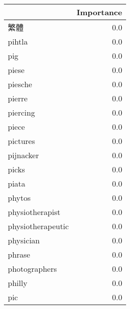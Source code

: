 \begin{tabular}{lr}
\toprule
{} &  Importance \\
\midrule
繁體                &         0.0 \\
pihtla            &         0.0 \\
pig               &         0.0 \\
piese             &         0.0 \\
piesche           &         0.0 \\
pierre            &         0.0 \\
piercing          &         0.0 \\
piece             &         0.0 \\
pictures          &         0.0 \\
pijnacker         &         0.0 \\
picks             &         0.0 \\
piata             &         0.0 \\
phytos            &         0.0 \\
physiotherapist   &         0.0 \\
physiotherapeutic &         0.0 \\
physician         &         0.0 \\
phrase            &         0.0 \\
photographers     &         0.0 \\
philly            &         0.0 \\
pic               &         0.0 \\
\bottomrule
\end{tabular}
